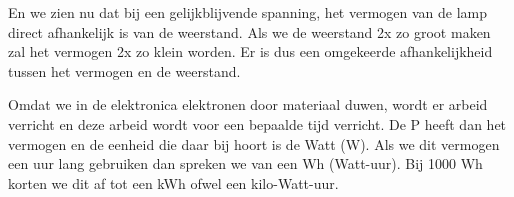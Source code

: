 En we zien nu dat bij een gelijkblijvende spanning, het vermogen van de lamp direct afhankelijk is van de weerstand. Als we de weerstand 2x zo groot maken zal het vermogen 2x zo klein worden. Er is dus een omgekeerde afhankelijkheid tussen het vermogen en de weerstand.

Omdat we in de elektronica elektronen door materiaal duwen, wordt er arbeid verricht en deze arbeid wordt voor een bepaalde tijd verricht. De P heeft dan het vermogen en de eenheid die daar bij hoort is de Watt (W). Als we dit vermogen een uur lang gebruiken dan spreken we van een Wh (Watt-uur). Bij 1000 Wh korten we dit af tot een kWh ofwel een kilo-Watt-uur.

